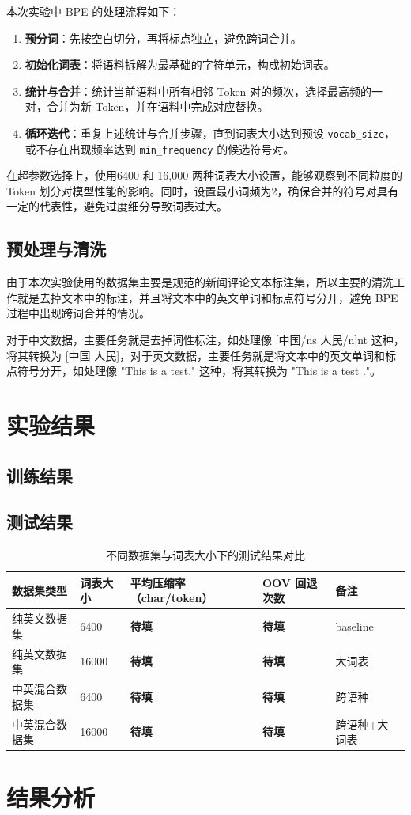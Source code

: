 \documentclass[a4paper,12pt]{ctexart} %
\begin{document}
本次实验中 BPE 的处理流程如下：
\begin{enumerate}
    \item \textbf{预分词}：先按空白切分，再将标点独立，避免跨词合并。
    \item \textbf{初始化词表}：将语料拆解为最基础的字符单元，构成初始词表。
    \item \textbf{统计与合并}：统计当前语料中所有相邻 Token 对的频次，选择最高频的一对，合并为新 Token，并在语料中完成对应替换。
    \item \textbf{循环迭代}：重复上述统计与合并步骤，直到词表大小达到预设 \texttt{vocab\_size}，或不存在出现频率达到 \texttt{min\_frequency} 的候选符号对。
\end{enumerate}
在超参数选择上，使用6400 和 16,000 两种词表大小设置，能够观察到不同粒度的 Token 划分对模型性能的影响。同时，设置最小词频为2，确保合并的符号对具有一定的代表性，避免过度细分导致词表过大。
\subsection{预处理与清洗}
由于本次实验使用的数据集主要是规范的新闻评论文本标注集，所以主要的清洗工作就是去掉文本中的标注，并且将文本中的英文单词和标点符号分开，避免 BPE 过程中出现跨词合并的情况。


对于中文数据，主要任务就是去掉词性标注，如处理像 [中国/ns 人民/n]nt 这种，将其转换为 [中国 人民]，对于英文数据，主要任务就是将文本中的英文单词和标点符号分开，如处理像 "This is a test." 这种，将其转换为 "This is a test ."。

\section{实验结果}


\subsection{训练结果}


\subsection{测试结果}

\begin{table}[H]
    \centering
    \caption{不同数据集与词表大小下的测试结果对比}
    \begin{tabular}{p{} p{} p{} p{} p{}}
        \toprule
        数据集类型 & 词表大小 & 平均压缩率（char/token） & OOV 回退次数 & 备注 \\
        \midrule
        纯英文数据集 & 6400  & \textbf{待填} & \textbf{待填} & baseline \\
        纯英文数据集 & 16000 & \textbf{待填} & \textbf{待填} & 大词表 \\
        中英混合数据集 & 6400  & \textbf{待填} & \textbf{待填} & 跨语种 \\
        中英混合数据集 & 16000 & \textbf{待填} & \textbf{待填} & 跨语种+大词表 \\
        \bottomrule
    \end{tabular}
\end{table}


\section{结果分析}
\end{document}
